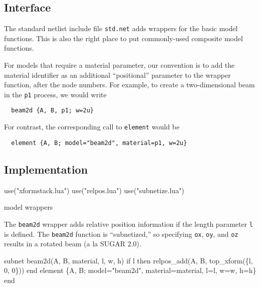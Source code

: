 
\subsection{Interface}

The standard netlist include file {\tt{}std.net} adds wrappers for
the basic model functions.  This is also the right place to put
commonly-used composite model functions.

For models that require a material parameter, our convention
is to add the material identifier as an additional ``positional''
parameter to the wrapper function, after the node numbers.
For example, to create a two-dimensional beam in the {\tt{}p1} process,
we would write
\begin{verbatim}
  beam2d {A, B, p1; w=2u}
\end{verbatim}
For contrast, the corresponding call to {\tt{}element} would be
\begin{verbatim}
  element {A, B; model="beam2d", material=p1, w=2u}
\end{verbatim}


\subsection{Implementation}

\endmoddef
use("xformstack.lua")
use("relpos.lua")
use("subnetize.lua")

\LA{}model wrappers~{\nwtagstyle{}}\RA{}
\nwendcode{}\nwdocspar

The {\tt{}beam2d} wrapper adds relative position information
if the length parameter {\tt{}l} is defined.  The {\tt{}beam2d}
function is ``subnetized,'' so specifying {\tt{}ox}, {\tt{}oy},
and {\tt{}oz} results in a rotated beam (a la SUGAR 2.0).

\nwenddocs{}\endmoddef
subnet beam2d(A, B, material, l, w, h)
  if l then
    relpos_add(A, B, top_xform(\{l, 0, 0\}))
  end
  element \{A, B; model="beam2d", material=material, l=l, w=w, h=h\}
end

\nwendcode{}\nwdocspar

